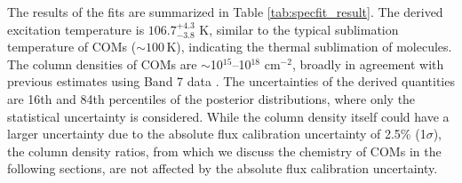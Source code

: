 \documentclass[linenumbers, twocolumn, twocolappendix, astrosymb, times]{aastex631}
\newcommand{\methanol}{CH$_3$OH\xspace}
\newcommand{\acetaldehyde}{CH$_3$CHO\xspace}
\newcommand{\acetone}{CH$_3$COCH$_3$\xspace}
\newcommand{\ethyleneoxide}{$c$-C$_2$H$_4$O\xspace}
\begin{document}
The results of the fits are summarized in Table \ref{tab:specfit_result}. The derived excitation temperature is $106.7_{-3.8}^{+4.3}$ K, similar to the typical sublimation temperature of COMs ($\sim100$\,K), indicating the thermal sublimation of molecules. The column densities of COMs are $\sim$10$^{15}$--10$^{18}$ cm$^{-2}$, broadly in agreement with previous estimates using Band 7 data \citep{Lee2019}. \textrm{The uncertainties of the derived quantities are 16th and 84th percentiles of the posterior distributions, where only the statistical uncertainty is considered. While the column density itself could have a larger uncertainty due to the absolute flux calibration uncertainty of 2.5\% (1$\sigma$), the column density ratios, from which we discuss the chemistry of COMs in the following sections, are not affected by the absolute flux calibration uncertainty.}

\begin{figure*}
\caption{Demonstration of the simultaneous spectral fit for a selected frequency range in SPW 7. The observed spectra (gray) is well reproduced by the model (black) composed of multiple blended transitions of different species, \methanol, \acetaldehyde, \acetone, \ethyleneoxide, and CH$_3^{13}$CHO (dashed colored lines).}
\label{fig:spectral_fit_demo}
\end{figure*}
\end{document}
